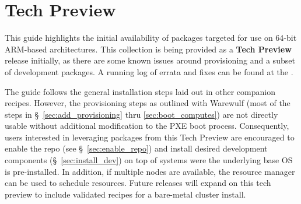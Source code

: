 \section{Tech Preview}

This guide highlights the initial availability of \OHPC{} packages targeted
for use on 64-bit ARM-based architectures. This collection is being provided as
a {\bf Tech Preview} release initially, as there are some known issues around
provisioning and a subset of development packages. A running log of errata and
fixes can be found at the
\href{https://github.com/openhpc/ohpc/wiki/ARM-Tech-Preview}{\color{blue}{ARM Tech Preview Wiki}}.

The guide follows the general installation steps laid out in other companion
\OHPC{} recipes.  However, the provisioning steps as outlined with Warewulf
(most of the steps in \S~\ref{sec:add_provisioning} thru
\ref{sec:boot_computes}) are not directly usable without additional
modification to the PXE boot process.  Consequently, users interested in
leveraging packages from this Tech Preview are encouraged to enable the repo
(see \S~\ref{sec:enable_repo}) and install desired development
components (\S~\ref{sec:install_dev}) on top of systems were the underlying
base OS is pre-installed. In addition, if multiple nodes are available, the
\rms{} resource manager can be used to schedule resources. Future \OHPC{} releases
will expand on this tech preview to include validated recipes for a bare-metal
cluster install. \\

